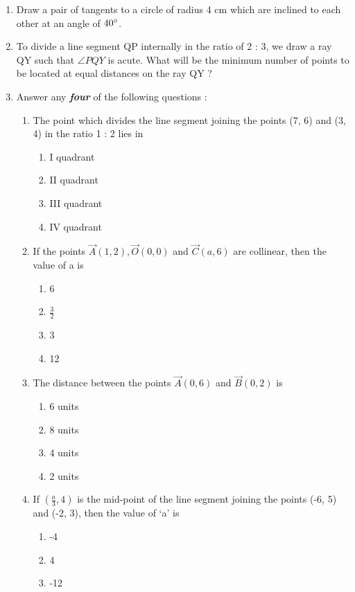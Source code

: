 \documentclass{article}
\begin{document}
\begin{enumerate}
		\item Draw a pair of tangents to a circle of radius 4 cm which are inclined to each other at an angle of $40\degree$. 

		\item To divide a line segment QP internally in the ratio of 2 : 3, we draw a ray QY such that $\angle PQY$ is acute. What will be the minimum number of points to be located at equal distances on the ray QY ? 

		\item Answer any \textbf{\textit{four}} of the following questions : 
		
		\begin{enumerate}
			\item The point which divides the line segment joining the points (7, 6) and (3, 4) in the ratio 1 : 2 lies in
			\begin{enumerate}
				\item I quadrant 
				\item II quadrant 
				\item III quadrant  
				\item IV quadrant
			\end{enumerate}
			\item  If the points $\vec{A}(1, 2), \vec{O}(0, 0)$ and $\vec{C}(a, 6)$ are collinear, then the value of a is 
			\begin{enumerate}
				\item 6
				\item $\frac{3}{2}$
				\item 3
				\item 12
			\end{enumerate}
			\item  The distance between the points $\vec{A}(0, 6)$ and $\vec{B}(0, 2)$ is 
			\begin{enumerate}
				\item 6 units
				\item 8 units
				\item 4 units
				\item 2 units
			\end{enumerate}
			\item  If $(\frac{a}{3},4)$ is the mid-point of the line segment joining the points (-6, 5) and (-2, 3), then the value of {\lq a\rq} is
			\begin{enumerate}
				\item -4
				\item 4
				\item -12

\end{enumerate}
\end{enumerate}
\end{enumerate}
\end{document}
